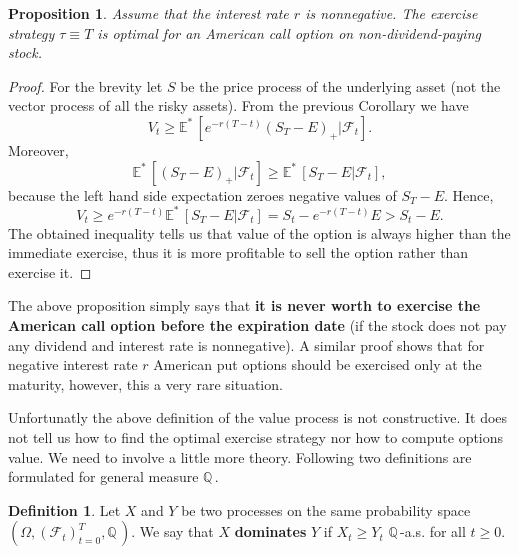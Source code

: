 \documentclass[a4paper,12pt, oneside]{book}
\newtheorem{prop}[thm]{Proposition}
\theoremstyle{definition}
\newtheorem{mydef}{Definition}[chapter]
\theoremstyle{remark}
\def\Q{{\mathbb{Q}}\,}
\def\Em{{\mathbb{E}^*}\,}
\begin{document}
\begin{prop}
 Assume that the interest rate $r$ is nonnegative. The exercise strategy $\tau \equiv T$ is optimal for an American call option on non-dividend-paying stock.
\end{prop}
\begin{proof}
 For the brevity let $S$ be the price process of the underlying asset (not the vector process of all the risky assets). From the previous Corollary we have
 \[V_t \geq \Em[e^{-r(T-t)}(S_T - E)_+ | \mathcal{F}_t].\] Moreover,
 \[\Em[(S_T - E)_+ | \mathcal{F}_t] \geq \Em[S_T - E | \mathcal{F}_t],\]
 because the left hand side expectation zeroes negative values of $S_T - E$. Hence,
 \[ V_t \geq e^{-r(T-t)}\Em[S_T - E | \mathcal{F}_t] = S_t - e^{-r(T-t)}E > S_t - E.\]
 The obtained inequality tells us that value of the option is always higher than the immediate exercise, thus it is more profitable to sell the option rather than exercise it.
\end{proof}
The above proposition simply says that \textbf{it is never worth to exercise the American call option before the expiration date} (if the stock does not pay any dividend and interest rate is nonnegative). A similar proof shows that for negative interest rate $r$ American put options should be exercised only at the maturity, however, this a very rare situation.

Unfortunatly the above definition of the value process is not constructive. It does not tell us how to find the optimal exercise strategy nor how to compute options value. We need to involve a little more theory. Following two definitions are formulated for general measure $\Q$. 

\begin{mydef}
 Let $X$ and $Y$ be two processes on the same probability space\\ $(\Omega, (\mathcal{F}_t)_{t=0}^T, \Q)$. We say that $X$ \textbf{dominates} $Y$ if $ X_t \geq Y_t$ $\Q$-a.s. for all $t \geq 0$.
\end{mydef}
 
\end{document}
